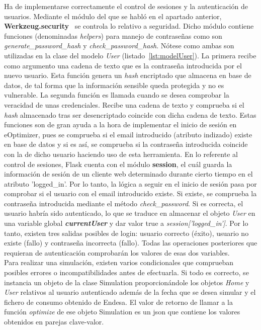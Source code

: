 Ha de implementarse correctamente el control de sesiones y la autenticación de usuarios. Mediante el módulo del que se habló en el apartado anterior, \textbf{Werkzeug.security}~\cite{Werk} se controla lo relativo a seguridad. Dicho módulo contiene funciones (denominadas \textit{helpers}) para manejo de contraseñas como son \textit{generate\_password\_hash} y \textit{check\_password\_hash}. Nótese como ambas son utilizadas en la clase del modelo \textit{User} (listado~\ref{lst:modelUser}). La primera recibe como argumento una cadena de texto que es la contraseña introducida por el nuevo usuario. Esta función genera un \textit{hash} encriptado que almacena en base de datos, de tal forma que la información sensible queda protegida y no es vulnerable. La segunda función es llamada cuando se desea comprobar la veracidad de unas credenciales. Recibe una cadena de texto y comprueba si el \textit{hash} almacenado tras ser desencriptado coincide con dicha cadena de texto. Estas funciones son de gran ayuda a la hora de implementar el inicio de sesión en eOptimizer, pues se comprueba si el email introducido (atributo indizado) existe en base de datos y si es así, se comprueba si la contraseña introducida coincide con la de dicho usuario haciendo uso de esta herramienta. En lo referente al control de sesiones, Flask cuenta con el módulo \textbf{session}, el cuál guarda la información de sesión de un cliente web determinado durante cierto tiempo en el atributo 'logged\_in'. Por lo tanto, la lógica a seguir en el inicio de sesión pasa por comprobar si el usuario con el email introducido existe. Si existe, se comprueba la contraseña introducida mediante el método \textit{check\_password}. Si es correcta, el usuario habría sido autenticado, lo que se traduce en almacenar el objeto \textit{User} en una variable global \textbf{\textit{currentUser}} y dar valor true a \textit{session['logged\_in']}. Por lo tanto, existen tres salidas posibles de login: usuario correcto (éxito), usuario no existe (fallo) y contraseña incorrecta (fallo). Todas las operaciones posteriores que requieran de autenticación comprobarán los valores de esas dos variables.\\

Para realizar una simulación, existen varios condicionales que comprueban posibles errores o incompatibilidades antes de efectuarla. Si todo es correcto, se instancia un objeto de la clase Simulation proporcionándole los objetos \textit{Home} y \textit{User} relativos al usuario autenticado además de la fecha que se desea simular y el fichero de consumo obtenido de Endesa. El valor de retorno de llamar a la función \textit{optimize} de ese objeto Simulation es un json que contiene los valores obtenidos en parejas clave-valor.\\

